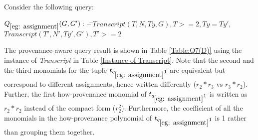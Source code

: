 \begin{example} \label{eg: assignment}
Consider the following query:
\begin{tabbing}
$Q_{\ref{eg: assignment}}(G, G') :- $\=$Transcript(T, N, Ty, G), T >= 2, Ty = Ty',$\\
\>$Transcript(T', N', Ty', G'), T' >= 2$
\end{tabbing}

The provenance-aware query result is shown in Table \ref{Table:Q7(D)} using the instance of {\em Transcript} in Table \ref{Instance of Transcript}. Note that the second and the third monomials for the tuple $t_{q_{\ref{eg: assignment}}1}$ are equivalent but correspond to different assignments, hence written differently ($r_2*r_3$ vs $r_3*r_2$).
Further, the first how-provenance monomial of $t_{q_{\ref{eg: assignment}}1}$ is written as $r_2*r_2$ instead of the compact form ($r_2^2$).  Furthermore, the coefficient of all the monomials in the how-provenance polynomial of $t_{q_{\ref{eg: assignment}}1}$ is 1 rather than grouping them together.




\end{example}


